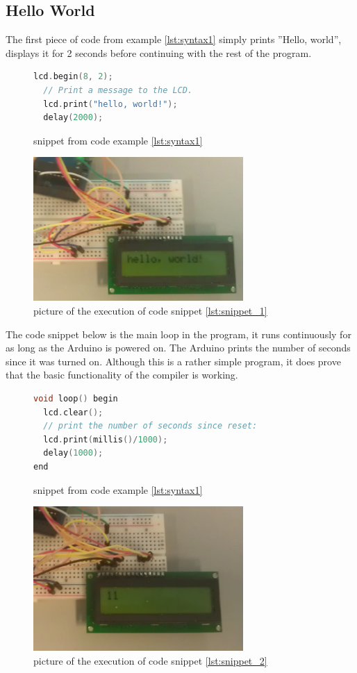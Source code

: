 \subsection*{Hello World}
The first piece of code from example \ref{lst:syntax1} simply prints ''Hello, world'', displays it for 2 seconds before continuing with the rest of the program.
\begin{figure}[h]
\begin{lstlisting}[caption=Hello World ,firstnumber=11, language={C++}, label=lst:snippet_1]
  lcd.begin(8, 2);
  // Print a message to the LCD.
  lcd.print("hello, world!");
  delay(2000);
\end{lstlisting}
\caption{snippet from code example \ref{lst:syntax1}}
\end{figure}
\begin{figure}[h]
\centering
\includegraphics[width=8cm]{billeder/test_hello_1.jpg}
\caption{picture of the execution of code snippet \ref{lst:snippet_1}}
\end{figure}

The code snippet below is the main loop in the program, it runs continuously for as long as the Arduino is powered on. The Arduino prints the number of seconds since it was turned on. Although this is a rather simple program, it does prove that the basic functionality of the compiler is working.
\begin{figure}[h]
\begin{lstlisting}[caption=Hello World ,firstnumber=17, language={C++},label=lst:snippet_2]
void loop() begin
  lcd.clear();
  // print the number of seconds since reset:
  lcd.print(millis()/1000);
  delay(1000);
end
\end{lstlisting}
\caption{snippet from code example \ref{lst:syntax1}}
\end{figure}
\begin{figure}[htb]
\centering
\includegraphics[width=8cm]{billeder/test_hello_2.jpg}
\caption{picture of the execution of code snippet \ref{lst:snippet_2}}
\end{figure}

